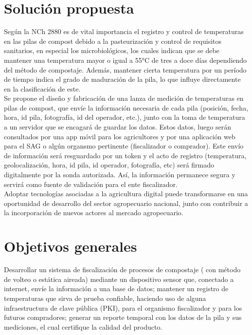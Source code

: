 \documentclass[12pt, letterpaper]{article}
\begin{document}
\section{Solución propuesta}
Según la NCh 2880 es de vital importancia el registro y control de temperaturas en las pilas de compost debido a la pasteurización y control de requisitos sanitarios, en especial los microbiológicos, los cuales indican que se debe mantener una temperatura mayor o igual a 55°C de tres a doce días dependiendo del método de compostaje. Además, mantener cierta temperatura por un período de tiempo indica el grado de maduración de la pila, lo que influye directamente en la clasificación de este. \\
Se propone el diseño y fabricación de una lanza de medición de temperaturas en pilas de compost, que envíe la información necesaria de cada pila (posición, fecha, hora, id pila, fotografía, id del operador, etc.), junto con la toma de temperatura a un servidor que se encagará de guardar los datos. Estos datos, luego serán consultados por una app móvil para los agricultores y por una aplicación web para el SAG o algún organsmo pertinente (fiscalizador o comprador). Este envío de información será resguardado por un token y el acto de registro (temperatura, geolocalización, hora, id pila, id operador, fotografía, etc) será firmado digitalmente por la sonda autorizada. Así, la información permanece segura y servirá como fuente de validación para el ente fiscalizador. \\
Adoptar tecnologías asociadas a la agricultura digital puede transformarse en una oportunidad de desarrollo del sector agropecuario nacional, junto con contribuir a la incorporación de nuevos actores al mercado agropecuario.


\section{Objetivos generales}
Desarrollar un sistema de fiscalización  de procesos de compostaje (
con método de volteo o estática aireada) mediante un dispositivo sensor que, conectado a internet, envíe la información a una base de datos; mantener un registro de temperaturas que sirva de prueba confiable, haciendo uso de alguna infraestructura de clave pública (PKI),
para el organismo fiscalizador y para los futuros compradores; generar un reporte temporal con los datos de la pila y sus mediciones, el cual certifique la calidad del producto.
\end{document}
